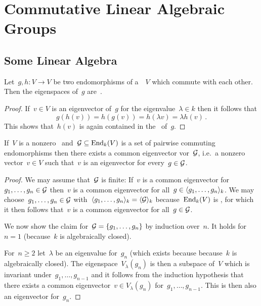 \section{Commutative Linear Algebraic Groups}





\subsection{Some Linear Algebra}


\begin{lemma}
  Let~$g, h \colon V \to V$ be two endomorphisms of a~{\kvs}~$V$ which commute with each other.
  Then the eigenspaces of~$g$ are~.
\end{lemma}


\begin{proof}
  If~$v \in V$ is an eigenvector of~$g$ for the eigenvalue~$\lambda \in k$ then it follows that
  \[
      g(h(v))
    = h(g(v))
    = h(\lambda v)
    = \lambda h(v) \,.
  \]
  This shows that~$h(v)$ is again contained in the~ of~$g$.
\end{proof}


\begin{corollary}
  \label{existence of common eigenvector}
  If~$V$ is a {\fd} nonzero~{\kvs} and~$\mathcal{G} \subseteq \operatorname{End}_k(V)$ is a set of pairwise commuting endomorphisms then there exists a common eigenvector vor~$\mathcal{G}$, i.e.\ a nonzero vector~$v \in V$ such that~$v$ is an eigenvector for every~$g \in \mathcal{G}$.
\end{corollary}


\begin{proof}
  We may assume that~$\mathcal{G}$ is finite:
  If~$v$ is a common eigenvector for~$g_1, \dotsc, g_n \in \mathcal{G}$ then~$v$ is a common eigenvector for all~$g \in \langle g_1, \dotsc, g_n \rangle_k$.
  We may choose~$g_1, \dotsc, g_n \in \mathcal{G}$ with~$\langle g_1, \dotsc, g_n\rangle_k = \langle\mathcal{G}\rangle_k$ because~$\operatorname{End}_k(V)$ is {\fd}, for which it then follows that~$v$ is a common eigenvector for all~$g \in \mathcal{G}$.
  
  We now show the claim for~$\mathcal{G} = \{g_1, \dotsc, g_n\}$ by induction over~$n$.
  It holds for~$n = 1$ (because~$k$ is algebraically closed).
  

  For~$n \geq 2$ let~$\lambda$ be an eigenvalue for~$g_n$ (which exists because because~$k$ is algebraically closed).
  The eigenspace~$V_\lambda(g_n)$ is then a subspace of~$V$ which is invariant under~$g_1, \dotsc, g_{n-1}$ and it follows from the induction hypothesis that there exists a common eigenvector~$v \in V_\lambda(g_n)$ for~$g_1, \dotsc, g_{n-1}$.
  This is then also an eigenvector for~$g_n$.
\end{proof}



